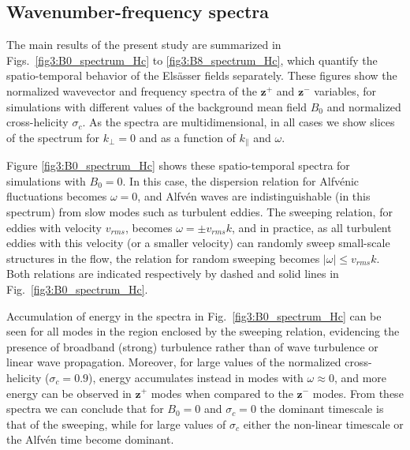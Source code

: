 \documentclass[aip,pop,reprint,amsmath,amssymb,floatfix]{revtex4-1}
\renewcommand{\vec}[1]{\mathbf{#1}}
\begin{document}
\subsection{Wavenumber-frequency spectra}\label{sec:wk}

The main results of the present study are summarized in
Figs.~\ref{fig3:B0_spectrum_Hc} to \ref{fig3:B8_spectrum_Hc}, which
quantify the spatio-temporal behavior of the Els\"asser fields
separately. These figures show the normalized wavevector and frequency
spectra of the $\vec{z}^+$ and $\vec{z}^-$ variables, for simulations
with different values of the background mean field $B_0$ and
normalized cross-helicity $\sigma_c$. As the spectra are multidimensional, in all
cases we show slices of the spectrum for $k_\perp=0$ and as a function
of $k_\parallel$ and $\omega$.

Figure \ref{fig3:B0_spectrum_Hc} shows these spatio-temporal spectra
for simulations with $B_0=0$. In this case, the dispersion relation
for Alfv\'enic fluctuations becomes $\omega=0$, and Alfv\'en waves are
indistinguishable (in this spectrum) from slow modes such as turbulent
eddies. The sweeping relation, for eddies with velocity $v_{rms}$,
becomes $\omega=\pm v_{rms} k$, and in practice, as all
turbulent eddies with this velocity (or a smaller velocity) can randomly 
sweep small-scale structures in the flow, the relation for random
sweeping becomes $|\omega| \leq v_{rms} k$. Both relations
are indicated respectively by dashed and solid lines in
Fig.~\ref{fig3:B0_spectrum_Hc}.

Accumulation of energy in the spectra in
Fig.~\ref{fig3:B0_spectrum_Hc} can be seen for all modes in the region
enclosed by the sweeping relation, evidencing the presence of
broadband (strong) turbulence rather than of wave turbulence or linear
wave propagation. Moreover, for large values of the normalized cross-helicity
($\sigma_c = 0.9$), energy accumulates instead in modes with
$\omega\approx 0$, and more energy can be observed in $\vec{z}^+$
modes when compared to the $\vec{z}^-$ modes. From these 
spectra we can conclude that for $B_0=0$ and $\sigma_c=0$ the dominant
timescale is that of the sweeping, while for large values of $\sigma_c$
either the non-linear timescale or the Alfv\'en time become dominant.
\end{document}
